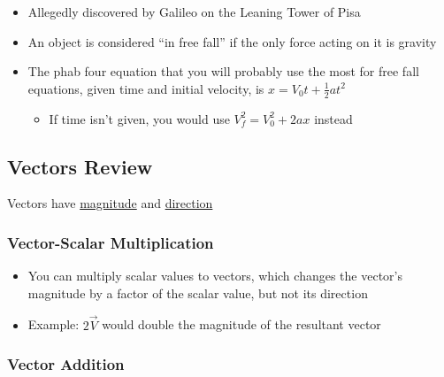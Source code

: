 \documentclass[
  letterpaper,
  DIV=11,
  numbers=noendperiod]{scrartcl}
\providecommand{\tightlist}{%
  \setlength{\itemsep}{0pt}\setlength{\parskip}{0pt}}\usepackage{longtable,booktabs,array}
\begin{document}
\begin{itemize}
\tightlist
\item
  Allegedly discovered by Galileo on the Leaning Tower of Pisa
\item
  An object is considered ``in free fall'' if the only force acting on
  it is gravity
\item
  The phab four equation that you will probably use the most for free
  fall equations, given time and initial velocity, is
  \(x = V_0t + \frac{1}{2}at^2\)

  \begin{itemize}
  \tightlist
  \item
    If time isn't given, you would use \(V_f^2 = V_0^2 + 2ax\) instead
  \end{itemize}
\end{itemize}

\hypertarget{vectors-review}{%
\subsection{Vectors Review}\label{vectors-review}}

Vectors have \ul{magnitude} and \ul{direction}

\hypertarget{vector-scalar-multiplication}{%
\subsubsection{Vector-Scalar
Multiplication}\label{vector-scalar-multiplication}}

\begin{itemize}
\tightlist
\item
  You can multiply scalar values to vectors, which changes the vector's
  magnitude by a factor of the scalar value, but not its direction
\item
  Example: \(2\vec{V}\) would double the magnitude of the resultant
  vector
\end{itemize}

\hypertarget{vector-addition}{%
\subsubsection{Vector Addition}\label{vector-addition}}
\end{document}
